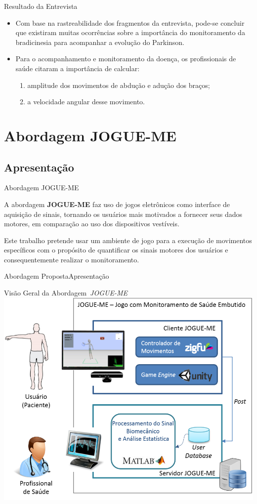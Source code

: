 \documentclass{beamer}
\begin{document}
\begin{frame}{Resultado da Entrevista} 
    \begin{block}{}
			\begin{itemize}[<+->]
				\item Com base na rastreabilidade dos fragmentos da entrevista, pode-se concluir que existiram muitas ocorrências sobre a importância do monitoramento da bradicinesia para acompanhar a evolução do Parkinson.
				\item Para o acompanhamento e monitoramento da doença, os profissionais de saúde citaram a importância de calcular:
					\begin{enumerate}
						\item amplitude dos movimentos de abdução e adução dos braços;
						\item a velocidade angular desse movimento.
					\end{enumerate}
			\end{itemize}
    \end{block}
\end{frame} 

\section{Abordagem JOGUE-ME}
\subsection{Apresentação}
\begin{frame}{Abordagem JOGUE-ME}
    \begin{block}{}
    A abordagem \textbf{JOGUE-ME} faz uso de jogos eletrônicos como interface de aquisição de sinais, tornando os usuários mais motivados a fornecer seus dados motores, em comparação ao uso dos dispositivos vestíveis.
    \end{block}
    
    
    \begin{block}{}
    Este trabalho pretende usar um ambiente de jogo para a execução de movimentos específicos com o propósito de quantificar os sinais motores dos usuários e consequentemente realizar o monitoramento. 
    \end{block}
\end{frame}

\begin{frame}{Abordagem Proposta}Apresentação
  \begin{block}{Visão Geral da Abordagem~\textit{JOGUE-ME}}
      \center \includegraphics[height=1.8 in]{img/visaosistema.png}
  \end{block}
\end{frame}
\end{document}
